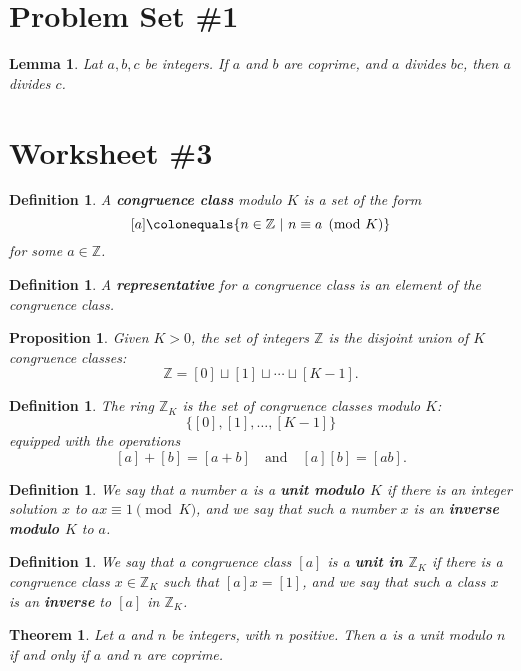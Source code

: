 \documentclass[12pt]{amsart}
\newcommand{\Z}{\mathbb{Z}}
\newcommand{\ceq}{\colonequals}
\numberwithin{equation}{section}
\theoremstyle{plain} %
\newtheorem{thm}	[section]	{Theorem}
\newtheorem{lem}	[section]	{Lemma}
\newtheorem{prop}	[section]	{Proposition}
\newtheorem{defn}	[section]	{Definition}
\begin{document}
\section*{Problem Set \#1}

\begin{lem} Lat $a,b,c$ be integers. If $a$ and $b$ are coprime, and $a$ divides $bc$, then $a$ divides $c$.
\end{lem}

\section*{Worksheet \#3}

\begin{defn} A \textbf{congruence class} modulo $K$ is a set of the form
\[ [a] \ceq \{ n\in \Z \ | \ n\equiv a \pmod{K}\}\]
for some $a\in \Z$.
\end{defn} 

\begin{defn} A \textbf{representative} for a congruence class is an element of the congruence class.
\end{defn}

\begin{prop} Given $K>0$, the set of integers $\Z$ is the disjoint union of $K$ congruence classes:
\[  \Z = [0] \sqcup [1] \sqcup \cdots \sqcup [K-1]. \]
\end{prop}

\begin{defn} The ring $\Z_K$ is the set of congruence classes modulo $K$:
\[\{ [0] , [1], \ldots, [K-1]\}\] equipped with the operations
\[ [a] + [b] = [a+b] \quad\text{and}\quad [a][b] = [ab].\]
\end{defn}


\begin{defn} We say that a number $a$ is a \textbf{unit modulo $K$}  if there is an integer solution $x$ to $ax\equiv 1 \pmod{K}$, and we say that such a number $x$ is an \textbf{inverse modulo $K$} to $a$.
\end{defn}

\begin{defn} We say that a congruence class $[a]$ is a \textbf{unit in $\Z_K$} if there is a congruence class $x \in \Z_K$ such that $[a] x = [1]$, and we say that such a class $x$ is an \textbf{inverse} to $[a]$ in $\Z_K$.
\end{defn}

\begin{thm}
 Let $a$ and $n$ be integers, with $n$ positive. Then $a$ is a unit modulo $n$ if and only if $a$ and $n$ are coprime.
 \end{thm}
 
\end{document}
